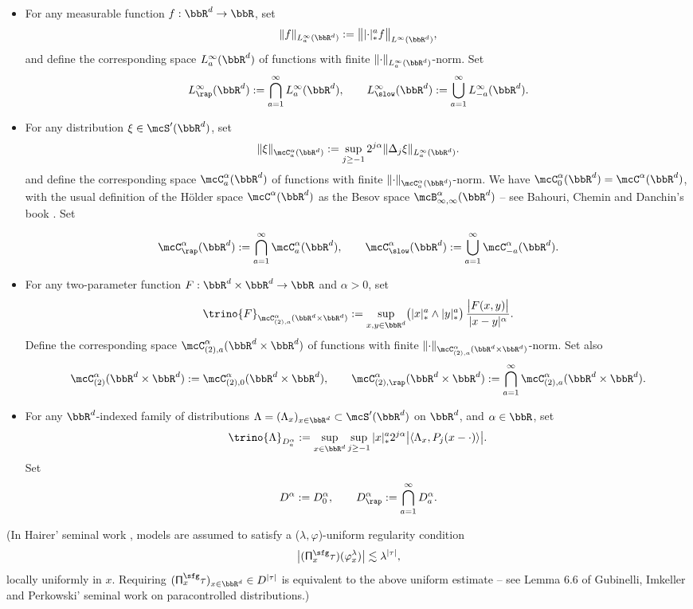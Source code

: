 \begin{itemize}
	\item For any measurable function $f:\bbR^d\to\bbR$, set
\[
\|f\|_{L_a^\infty(\bbR^d)} := \big\||{\cdot}|_*^a f\big\|_{L^\infty(\bbR^d)},
\]
and define the corresponding space $L_a^\infty(\bbR^d)$ of functions with finite $\|{\cdot}\|_{L_a^\infty(\bbR^d)}$-norm. Set
\[
L_{\rap}^\infty(\bbR^d) := \bigcap_{a=1}^\infty L_a^\infty(\bbR^d), \qquad L_{\slow}^\infty(\bbR^d) := \bigcup_{a=1}^\infty L_{-a}^\infty(\bbR^d).
\]

	\item For any distribution $\xi\in\mcS'(\bbR^d)$, set
\[
\|\xi\|_{\mcC_a^\alpha(\bbR^d)} := \sup_{j\ge-1}2^{j\alpha}\|\Delta_j\xi\|_{L_a^\infty(\bbR^d)}.
\]
and define the corresponding space $\mcC_a^\alpha(\bbR^d)$ of functions with finite $\|{\cdot}\|_{\mcC_a^\alpha(\bbR^d)}$-norm. We have $\mcC^\alpha_0(\bbR^d) = \mcC^\alpha(\bbR^d)$, with the usual definition of the Hölder space $\mcC^\alpha(\bbR^d)$ as the Besov space $\mcB^\alpha_{\infty,\infty}(\bbR^d)$ -- see \eg Bahouri, Chemin and Danchin's book \cite{BCD11}. Set

\[
\mcC_\rap^\alpha(\bbR^d) := \bigcap_{a=1}^\infty \mcC_a^\alpha(\bbR^d), \qquad \mcC_\slow^\alpha(\bbR^d) := \bigcup_{a=1}^\infty \mcC_{-a}^\alpha(\bbR^d).
\]

	\item For any two-parameter function $F:\bbR^d\times\bbR^d\to\bbR$ and $\alpha>0$, set
\[
\trino{F}_{\mcC_{(2),a}^\alpha(\bbR^d\times\bbR^d)} := \sup_{x,y\in\bbR^d}\bigl(|x|_*^a\wedge|y|_*^a\bigr)\,\frac{\big|F(x,y)\big|}{|x-y|^\alpha}.
\]
Define the corresponding space $\mcC_{(2),a}^\alpha(\bbR^d\times\bbR^d)$ of functions with finite $\|{\cdot}\|_{\mcC_{(2),a}^\alpha(\bbR^d\times\bbR^d)}$-norm. Set also
\[
\mcC_{(2)}^\alpha(\bbR^d\times\bbR^d) := \mcC_{(2),0}^\alpha(\bbR^d\times\bbR^d), \qquad \mcC^\alpha_{(2),\rap}(\bbR^d\times\bbR^d) := \bigcap_{a=1}^\infty \mcC^\alpha_{(2),a}(\bbR^d\times\bbR^d).
\]

	\item For any $\bbR^d$-indexed family of distributions $\Lambda=(\Lambda_x)_{x\in\bbR^d}\subset\mcS'(\bbR^d)$ on $\bbR^d$, and $\alpha\in\bbR$, set
\begin{align*}
\trino{\Lambda}_{D_a^\alpha}:=\sup_{x\in\bbR^d}\sup_{j\ge-1}|x|_*^a2^{j\alpha}\big| \langle\Lambda_x, P_j(x-\cdot)\rangle\big|.
\end{align*}
Set\vspace*{-3pt}
\[
D^\alpha:=D_0^\alpha, \qquad D_\rap^\alpha := \bigcap_{a=1}^\infty D^\alpha_a.
\]
\end{itemize}
(In Hairer' seminal work \cite{Hai}, models are assumed to satisfy a ($\lambda, \varphi$)-uniform regularity condition\vspace*{-3pt}
\[
\big|({\sf \Pi}^{\sfg}_x\tau)(\varphi_x^\lambda)\big|\lesssim\lambda^{|\tau|},
\]
locally uniformly in $x$. Requiring $({\sf \Pi}^{\sfg}_x\tau)_{x\in\bbR^d}\in D^{|\tau|}$ is equivalent to the above uniform estimate -- see \eg Lemma 6.6 of Gubinelli, Imkeller and Perkowski' seminal work \cite{GIP} on paracontrolled distributions.)

